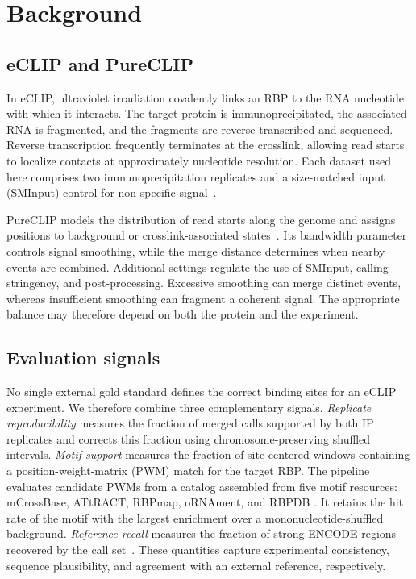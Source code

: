 \section{Background}
\label{theory}

\subsection{eCLIP and PureCLIP}

In eCLIP, ultraviolet irradiation covalently links an RBP to the RNA nucleotide
with which it interacts. The target protein is immunoprecipitated, the associated
RNA is fragmented, and the fragments are reverse-transcribed and sequenced.
Reverse transcription frequently terminates at the crosslink, allowing read
starts to localize contacts at approximately nucleotide resolution. Each dataset
used here comprises two immunoprecipitation replicates and a size-matched input
(SMInput) control for non-specific signal~\parencite{vannostrand2016}.

PureCLIP models the distribution of read starts along the genome and assigns
positions to background or crosslink-associated states~\parencite{krakau2017}.
Its bandwidth parameter controls signal smoothing, while the merge distance
determines when nearby events are combined. Additional settings regulate the use
of SMInput, calling stringency, and post-processing. Excessive smoothing can
merge distinct events, whereas insufficient smoothing can fragment a coherent
signal. The appropriate balance may therefore depend on both the protein and the
experiment.

\subsection{Evaluation signals}

No single external gold standard defines the correct binding sites for an eCLIP
experiment. We therefore combine three complementary signals. \emph{Replicate
reproducibility} measures the fraction of merged calls supported by both IP
replicates and corrects this fraction using chromosome-preserving shuffled
intervals. \emph{Motif support} measures the fraction of site-centered windows
containing a position-weight-matrix (PWM) match for the target RBP. The pipeline
evaluates candidate PWMs from a catalog assembled from five motif resources:
mCrossBase, ATtRACT, RBPmap, oRNAment, and RBPDB
\parencite{feng2019,giudice2016,paz2014,bouvrette2020,cook2011}. It retains the
hit rate of the motif with the largest enrichment over a mononucleotide-shuffled
background. \emph{Reference recall} measures the fraction
of strong ENCODE regions recovered by the call set~\parencite{vannostrand2020}. These quantities capture experimental consistency, sequence
plausibility, and agreement with an external reference, respectively.

